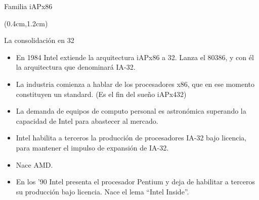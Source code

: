 \documentclass[table,dvipsnames,aspectratio=169]{beamer}
\begin{document}
\begin{frame}{Familia iAPx86}
 \begin{textblock*}{\textwidth}(0.4cm,1.2cm)
  \begin{block}{La consolidación en \SI{32}{\bit}}
   \begin{itemize}[<+(1)->]\justifying
    \item En 1984 Intel \textcolor{furfiBlue}{extiende la arquitectura iAPx86 a \SI{32}{\bit}}. Lanza el 80386, y con él la arquitectura que denominará IA-32.
    \item La industria comienza a hablar de los procesadores x86, \textcolor{furfiBlue}{que en ese momento constituyen un standard}. (Es el fin del sueño iAPx432)
    \item La demanda de equipos de computo personal es astronómica \textcolor{furfiBlue}{superando la capacidad de Intel para abastecer al mercado}.
    \item Intel \textcolor{furfiBlue}{habilita a terceros la producción de procesadores IA-32} bajo licencia, para mantener el impulso de expansión de IA-32.
    \item Nace AMD.
    \item En los '90 Intel presenta el procesador Pentium y \textcolor{furfiBlue}{deja de habilitar a terceros su producción} bajo licencia. Nace el lema ``Intel Inside''.
   \end{itemize}
  \end{block}
 \end{textblock*}
\end{frame}
 
\end{document}
